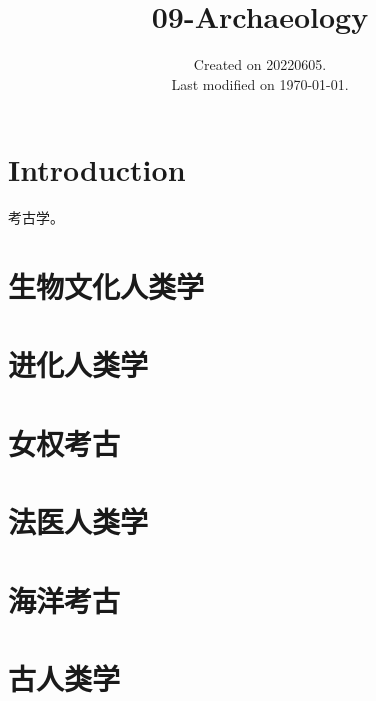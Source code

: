 \documentclass[UTF8]{../RepresentationUniverse}
\begin{document}
\title{09-Archaeology}
\date{Created on 20220605.\\   Last modified on \today.}
\maketitle
\tableofcontents


\chapter{Introduction}
考古学。

\chapter{生物文化人类学}
\chapter{进化人类学}
\chapter{女权考古}
\chapter{法医人类学}
\chapter{海洋考古}
\chapter{古人类学}
\end{document}
